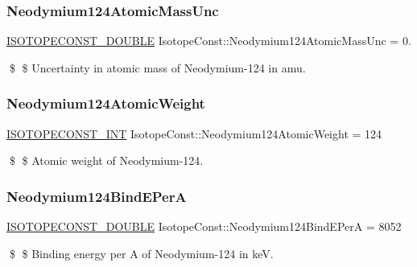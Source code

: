 \subsubsection{\texorpdfstring{Neodymium124\+Atomic\+Mass\+Unc}{Neodymium124AtomicMassUnc}}
{\footnotesize\ttfamily \mbox{\hyperlink{group___isotope_const-_macros_ga8f45a7272ce02c0b4c65c44636ed719a}{I\+S\+O\+T\+O\+P\+E\+C\+O\+N\+S\+T\+\_\+\+D\+O\+U\+B\+LE}} Isotope\+Const\+::\+Neodymium124\+Atomic\+Mass\+Unc = 0.}

\$ \$ Uncertainty in atomic mass of Neodymium-\/124 in amu. \mbox{\label{group___isotope_const-_neodymium-_nd124_ga1fcb3bad8c8df5e76d2ee0e35c322129}} 
\subsubsection{\texorpdfstring{Neodymium124\+Atomic\+Weight}{Neodymium124AtomicWeight}}
{\footnotesize\ttfamily \mbox{\hyperlink{group___isotope_const-_macros_ga5f18360b3e99483a35c32d789e62621c}{I\+S\+O\+T\+O\+P\+E\+C\+O\+N\+S\+T\+\_\+\+I\+NT}} Isotope\+Const\+::\+Neodymium124\+Atomic\+Weight = 124}

\$ \$ Atomic weight of Neodymium-\/124. \mbox{\label{group___isotope_const-_neodymium-_nd124_ga4782e6ac471d7ef760e48c2237378d49}} 
\subsubsection{\texorpdfstring{Neodymium124\+Bind\+E\+PerA}{Neodymium124BindEPerA}}
{\footnotesize\ttfamily \mbox{\hyperlink{group___isotope_const-_macros_ga8f45a7272ce02c0b4c65c44636ed719a}{I\+S\+O\+T\+O\+P\+E\+C\+O\+N\+S\+T\+\_\+\+D\+O\+U\+B\+LE}} Isotope\+Const\+::\+Neodymium124\+Bind\+E\+PerA = 8052}

\$ \$ Binding energy per A of Neodymium-\/124 in keV. \mbox{\label{group___isotope_const-_neodymium-_nd124_ga46e487405d0373af9f602391a3067218}} 
